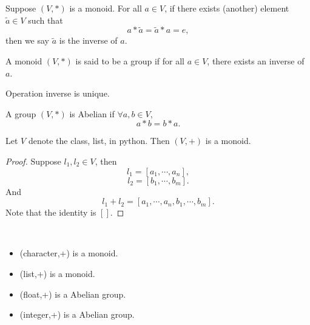 \documentclass[12pt]{book}
\begin{document}
\begin{definition}[Inverse]
Suppose $(V,*)$ is a monoid. For all $a \in V$, if there exists (another) element $\tilde a\in V$ such that 
$$
a*\tilde a = \tilde a *a =e,
$$
then we say $\tilde a $ is the inverse of $a$.
\end{definition}

\begin{definition}[Group]
A monoid $(V,*)$ is said to be  a group if for all $a \in V$, there exists an inverse of $a$.
\end{definition}

\begin{theorem}
Operation inverse is unique.	
\end{theorem}

\begin{definition}
A group $(V,*)$ is Abelian if $\forall a,b \in V$,
$$
a*b=b*a.
$$
	
\end{definition}


\begin{example}[+ in python]
Let $V$ denote the class, list, in python. Then $(V,+)$ is a monoid.  
\end{example}
\begin{proof}
	Suppose $l_1,l_2 \in V$, then
$$
l_1 = [a_1,\cdots,a_n],
$$
$$
l_2 = [b_1,\cdots,b_m].
$$
And
$$
l_1 + l_2 = [a_1,\cdots,a_n,b_1,\cdots,b_m].
$$
Note that the identity is $[]$.
\end{proof}

\begin{remark}\
\begin{itemize}
	\item (character,+) is a monoid.
	\item (list,+) is a monoid.
	\item (float,+) is a Abelian group.
	\item (integer,+) is a Abelian group.
\end{itemize}
\end{remark}
\end{document}

